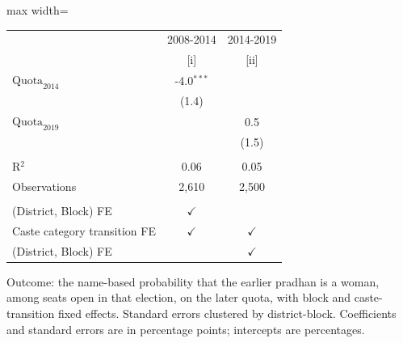 
\begingroup
\centering
\scriptsize
\begin{adjustbox}{max width=\linewidth}
   \begin{threeparttable}[b]
      \begin{tabular}{lcc}
         \toprule
                                      & 2008-2014     & 2014-2019 \\
                                      & [i]           & [ii]\\
         \midrule
         $\text{Quota}_{2014}$        & -4.0$^{***}$  &   \\
                                      & (1.4)         &   \\
         $\text{Quota}_{2019}$        &               & 0.5\\
                                      &               & (1.5)\\
          \\
         R$^2$                        & 0.06          & 0.05\\
         Observations                 & 2,610         & 2,500\\
          \\
         (District, Block) FE         & $\checkmark$  & \\
         Caste category transition FE & $\checkmark$  & $\checkmark$\\
         (District, Block) FE         &               & $\checkmark$\\
         \bottomrule
      \end{tabular}

      \begin{tablenotes}
         \item Outcome: the name-based probability that the earlier pradhan is a woman, among seats open in that election, on the later quota, with block and caste-transition fixed effects. Standard errors clustered by district-block. Coefficients and standard errors are in percentage points; intercepts are percentages.
      \end{tablenotes}
   \end{threeparttable}
\end{adjustbox}
\par\endgroup


